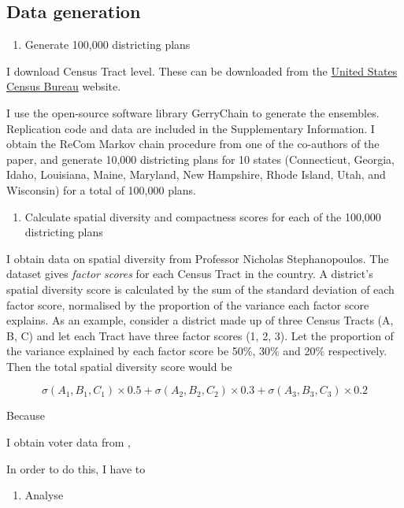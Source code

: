 \documentclass[]{article}
\providecommand{\tightlist}{%
  \setlength{\itemsep}{0pt}\setlength{\parskip}{0pt}}
\begin{document}
\hypertarget{data-generation}{%
\subsection{Data generation}\label{data-generation}}

\begin{enumerate}
\def\labelenumi{\arabic{enumi}.}
\tightlist
\item
  Generate 100,000 districting plans
\end{enumerate}

I download Census Tract level. These can be downloaded from the
\href{census.gov}{United States Census Bureau} website.

I use the open-source software library GerryChain to generate the
ensembles. Replication code and data are included in the Supplementary
Information. I obtain the ReCom Markov chain procedure from one of the
co-authors of the \cite{ddj2019recom} paper, and generate 10,000
districting plans for 10 states (Connecticut, Georgia, Idaho, Louisiana,
Maine, Maryland, New Hampshire, Rhode Island, Utah, and Wisconsin) for a
total of 100,000 plans.

\begin{enumerate}
\def\labelenumi{\arabic{enumi}.}
\setcounter{enumi}{1}
\tightlist
\item
  Calculate spatial diversity and compactness scores for each of the
  100,000 districting plans
\end{enumerate}

I obtain data on spatial diversity from Professor Nicholas
Stephanopoulos. The dataset gives \emph{factor scores} for each Census
Tract in the country. A district's spatial diversity score is calculated
by the sum of the standard deviation of each factor score, normalised by
the proportion of the variance each factor score explains. As an
example, consider a district made up of three Census Tracts (A, B, C)
and let each Tract have three factor scores (1, 2, 3). Let the
proportion of the variance explained by each factor score be 50\%, 30\%
and 20\% respectively. Then the total spatial diversity score would be

\[ \sigma(A_1, B_1, C_1) \times 0.5 + \sigma(A_2, B_2, C_2) \times 0.3 + \sigma(A_3,
B_3, C_3) \times 0.2\]

Because

I obtain voter data from \citeauthor{er2019},

In order to do this, I have to

\begin{enumerate}
\def\labelenumi{\arabic{enumi}.}
\setcounter{enumi}{2}
\tightlist
\item
  Analyse
\end{enumerate}
\end{document}
